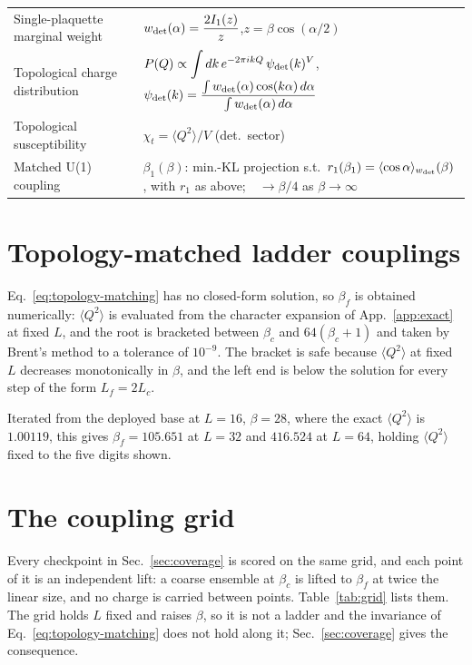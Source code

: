 \documentclass[prd, twocolumn, superscriptaddress, nofootinbib,floatfix]{revtex4-2}
\DeclareRobustCommand{\Eq}[1]{Eq.~\eqref{eq:#1}}
\DeclareRobustCommand{\app}[1]{App.~\ref{app:#1}}
\DeclareRobustCommand{\sect}[1]{Sec.~\ref{sec:#1}}
\DeclareRobustCommand{\tb}[1]{Table~\ref{tab:#1}}
\begin{document}
\begin{table}[htbp]
\begin{tabular}{p{4.5cm}p{11.5cm}}
\midrule
Single-plaquette marginal weight &
  $w_{\rm det}(\alpha) = \dfrac{2 I_1(z)}{z}$,\quad $z=\beta\cos(\alpha/2)$ \\
Topological charge distribution &
  $P(Q) \propto \displaystyle\int dk\, e^{-2\pi ikQ}\,\psi_{\rm det}(k)^V$,\quad
  $\psi_{\rm det}(k) = \dfrac{\int w_{\rm det}(\alpha)\cos(k\alpha)\,d\alpha}{\int w_{\rm det}(\alpha)\,d\alpha}$ \\
Topological susceptibility &
  $\chi_t = \langle Q^2\rangle/V$ (det.\ sector) \\
Matched U(1) coupling &
  $\beta_1(\beta)$: min.-KL projection s.t.\ $r_1(\beta_1) = \langle\cos\alpha\rangle_{w_{\rm det}}(\beta)$, with $r_1$ as above;\ \ $\to \beta/4$ as $\beta\to\infty$ \\
\bottomrule
\end{tabular}
\end{table}

\section{Topology-matched ladder couplings}
\label{app:matching}

\Eq{topology-matching} has no closed-form solution, so $\beta_f$ is obtained
numerically: $\langle Q^2\rangle$ is evaluated from the character expansion of
\app{exact} at fixed $L$, and the root is bracketed between $\beta_c$ and
$64(\beta_c+1)$ and taken by Brent's method to a tolerance of $10^{-9}$. The
bracket is safe because $\langle Q^2\rangle$ at fixed $L$ decreases
monotonically in $\beta$, and the left end is below the solution for every step
of the form $L_f=2L_c$.

Iterated from the deployed base at $L=16$, $\beta=28$, where the exact
$\langle Q^2\rangle$ is $1.00119$, this gives $\beta_f=105.651$ at $L=32$ and
$416.524$ at $L=64$, holding $\langle Q^2\rangle$ fixed to the five digits
shown.

\section{The coupling grid}
\label{app:grid}

Every checkpoint in \sect{coverage} is scored on the same grid, and each point of
it is an independent lift: a coarse ensemble at $\beta_c$ is lifted to
$\beta_f$ at twice the linear size, and no charge is carried between points.
\tb{grid} lists them. The grid holds $L$ fixed and raises $\beta$, so it is not
a ladder and the invariance of \Eq{topology-matching} does not hold along it;
\sect{coverage} gives the consequence.
\end{document}
